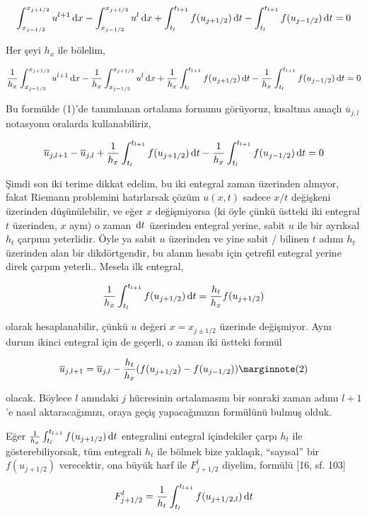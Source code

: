 \documentclass[12pt,fleqn]{article}\usepackage{../../common}
\begin{document}
$$
\int_{x_{j-1/2}}^{x_{j+1/2}} u^{l+1} \,\mathrm{d} x -
\int_{x_{j-1/2}}^{x_{j+1/2}} u^{l} \,\mathrm{d} x  +
\int_{t_l}^{t_{l+1}} f(u_{j+1/2}) \,\mathrm{d} t  -
\int_{t_l}^{t_{l+1}} f(u_{j-1/2}) \,\mathrm{d} t = 0
$$

Her şeyi $h_x$ ile bölelim,

$$
\frac{1}{h_x} \int_{x_{j-1/2}}^{x_{j+1/2}} u^{l+1} \,\mathrm{d} x -
\frac{1}{h_x} \int_{x_{j-1/2}}^{x_{j+1/2}} u^{l} \,\mathrm{d} x  +
\frac{1}{h_x} \int_{t_l}^{t_{l+1}} f(u_{j+1/2}) \,\mathrm{d} t  -
\frac{1}{h_x} \int_{t_l}^{t_{l+1}} f(u_{j-1/2}) \,\mathrm{d} t = 0
$$

Bu formülde (1)'de tanımlanan ortalama formunu görüyoruz, kısaltma amaçlı
$\overline{u}_{j,l}$ notasyonu oralarda kullanabiliriz,

$$
\overline{u}_{j,l+1} - \overline{u}_{j,l} + 
\frac{1}{h_x} \int_{t_l}^{t_{l+1}} f(u_{j+1/2}) \,\mathrm{d} t  -
\frac{1}{h_x} \int_{t_l}^{t_{l+1}} f(u_{j-1/2}) \,\mathrm{d} t = 0
$$

Şimdi son iki terime dikkat edelim, bu iki entegral zaman üzerinden alınıyor,
fakat Riemann problemini hatırlarsak çözüm $u(x,t)$ sadece $x/t$ değişkeni
üzerinden düşünülebilir, ve eğer $x$ değişmiyorsa (ki öyle çünkü üstteki iki
entegral $t$ üzerinden, $x$ aynı) o zaman $\,\mathrm{d} t$ üzerinden entegral yerine,
sabit $u$ ile bir ayrıksal $h_t$ çarpımı yeterlidir. Öyle ya sabit $u$ üzerinden
ve yine sabit / bilinen $t$ adımı $h_t$ üzerinden alan bir dikdörtgendir, bu
alanın hesabı için çetrefil entegral yerine direk çarpım yeterli.. Mesela ilk
entegral,

$$
\frac{1}{h_x} \int_{t_l}^{t_{l+1}} f(u_{j+1/2}) \,\mathrm{d} t =
\frac{h_t}{h_x} f(u_{j+1/2})
$$

olarak hesaplanabilir, çünkü $u$ değeri $x = x_{j \pm 1/2}$ üzerinde değişmiyor.
Aynı durum ikinci entegral için de geçerli, o zaman iki üstteki formül

$$
\overline{u}_{j,l+1} = \overline{u}_{j,l} -
\frac{h_t}{h_x} ( f(u_{j+1/2}) - f(u_{j-1/2}) )
\mlabel{2}
$$

olacak. Böylece $l$ anındaki $j$ hücresinin ortalamasını bir sonraki zaman adımı
$l+1$'e nasıl aktaracağımızı, oraya geçiş yapacağımızın formülünü bulmuş olduk.

Eğer $\frac{1}{h_x} \int_{t_l}^{t_{l+1}} f(u_{j+1/2}) \,\mathrm{d} t$ entegralini
entegral içindekiler çarpı $h_t$ ile gösterebiliyorsak, tüm
entegrali $h_t$ ile bölmek bize yaklaşık, ``sayısal'' bir $f(u_{j+1/2})$
verecektir, ona büyük harf ile $F_{j+1/2}^l$ diyelim, formülü [16, sf. 103]

$$
F_{j+1/2}^l = \frac{1}{h_t} \int_{t_l}^{t_{l+1}} f(u_{j+1/2,l}) \,\mathrm{d} t
$$
\end{document}
